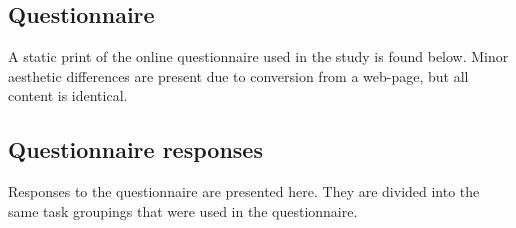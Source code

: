 \begin{appendices}
\makeatletter
\renewcommand{\thesubsection}{\@arabic\c@subsection}  %
\makeatother

\subsection{Questionnaire}

A static print of the online questionnaire used in the study is found below.
Minor aesthetic differences are present due to conversion from a web-page,
but all content is identical.



\subsection{Questionnaire responses}

Responses to the questionnaire are presented here.
They are divided into the same task groupings that were used in the questionnaire.


\end{appendices}
